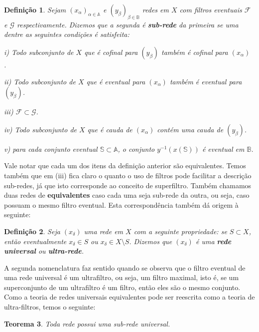\documentclass[12pt, a4paper]{article}
\newtheorem{mydef}{Definição}[section]
\newtheorem{thrm}[mydef]{Teorema}
\theoremstyle{definition}
\begin{document}
\begin{mydef}
	Sejam $(x_\alpha )_{\alpha \in \mathbb{A}}$ e $(y_\beta )_{\beta \in \mathbb{B}}$ redes em $X$ com filtros eventuais  $\mathcal{F}$ e  $\mathcal{G}$ respectivamente. Dizemos que a segunda é \textbf{sub-rede} da primeira se uma dentre as seguintes condições é satisfeita: \
	
	i) Todo subconjunto de $X$ que é cofinal para $(y_\beta )$ também é cofinal para $(x_\alpha )$.\
	
	ii) Todo subconjunto de $X$ que é eventual para $(x_\alpha )$ também é eventual para $(y_\beta )$.\
	
	iii) $\mathcal{F} \subset \mathcal{G}$.\
	
	iv) Todo subconjunto de $X$ que é cauda de $(x_\alpha )$ contém uma cauda de $(y_\beta )$.\
	
	v) para cada conjunto eventual $ \mathbb{S} \subset  \mathbb{A}$, o conjunto $y^{-1}(x( \mathbb{S}))$ é eventual em $ \mathbb{B}$.
	 
	
\end{mydef}

Vale notar que cada um dos itens da definição anterior são equivalentes. Temos também que em (iii) fica claro o quanto o uso de filtros pode facilitar a descrição sub-redes, já que isto corresponde ao conceito de superfiltro. Também chamamos duas redes de \textbf{equivalentes} caso cada uma seja sub-rede da outra, ou seja, caso possuam o mesmo filtro eventual. Esta correspondência também dá origem à seguinte:\\

\begin{mydef}
	Seja $(x_\delta )$ uma rede em $X$ com a seguinte propriedade: se $S\subset X$, então eventualmente $x_\delta \in S$ ou $x_\delta \in X\setminus S$. Dizemos que  $(x_\delta )$ é uma \textbf{rede universal} ou \textbf{ultra-rede}.
	
\end{mydef}

A segunda nomenclatura faz sentido quando se observa que o filtro eventual de uma rede universal é um ultrafiltro, ou seja, um filtro maximal, isto é, se um superconjunto de um ultrafiltro é um filtro, então eles são o mesmo conjunto. Como a teoria de redes universais equivalentes pode ser reescrita como a teoria de ultra-filtros, temos o seguinte:

\begin{thrm}
 	Toda rede possui uma sub-rede universal.  	
\end{thrm}
 
\end{document}

